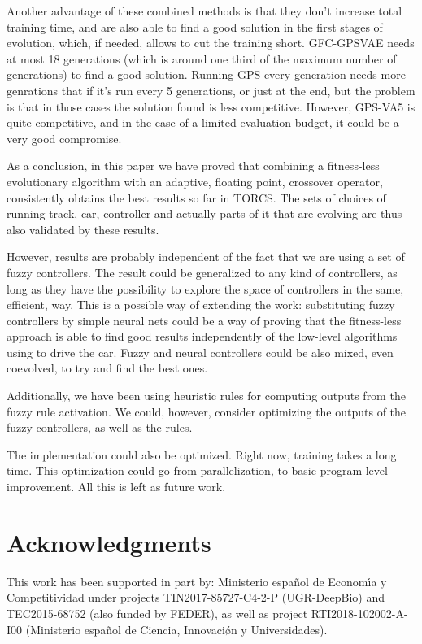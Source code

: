 \documentclass[10pt,journal,compsoc]{IEEEtran}
\begin{document}
Another advantage of these combined methods is that they don't
increase total training time, and are also able to find a good
solution in the first stages of evolution, which, if needed, allows to
cut the training short. {\sf GFC-GPSVAE} needs at most 18 generations
(which is around one third of the maximum number of generations) to
find a good solution. Running GPS every generation needs more
genrations that if it's run every 5 generations, or just at the end,
but the problem is that in those cases the solution found is less
competitive. However, {\sf GPS-VA5} is quite competitive, and in the
case of a limited evaluation budget, it could be a very good
compromise.

As a conclusion, in this paper we have proved that combining a
fitness-less evolutionary algorithm with an adaptive, floating point,
crossover operator, consistently obtains the best results so far in
TORCS. The sets of choices of running track, car, controller and
actually parts of it that are evolving are thus also validated by
these results.

However, results are probably independent of the fact that we are using a
set of fuzzy controllers. The result could be generalized to any kind
of controllers, as long as they have the possibility to explore the
space of controllers in the same, efficient, way. This is a possible
way of extending the work: substituting fuzzy controllers by simple
neural nets could be a way of proving that the fitness-less approach
is able to find good results independently of the low-level algorithms
using to drive the car. Fuzzy and neural controllers could be also
mixed, even coevolved, to try and find the best ones. 

Additionally, we have been using heuristic rules for computing outputs
from the fuzzy rule activation. We could, however, consider optimizing
the outputs of the fuzzy controllers, as well as the rules.

The implementation could also be optimized. Right now, training takes
a long time. This optimization could go from parallelization, to basic
program-level improvement. All this is left as future work.



\section*{Acknowledgments}

This work has been supported in part by: Ministerio espa\~{n}ol de
Econom\'{\i}a y Competitividad under projects  TIN2017-85727-C4-2-P (UGR-DeepBio) and TEC2015-68752 (also funded by FEDER), as well as project RTI2018-102002-A-I00 (Ministerio espa\~{n}ol de Ciencia, Innovaci\'{\o}n y Universidades).
\end{document}

